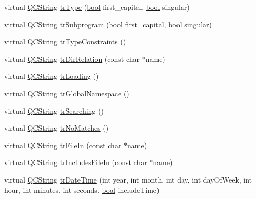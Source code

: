 \begin{DoxyCompactItemize}
\item 
virtual \hyperlink{class_q_c_string}{Q\+C\+String} \hyperlink{class_translator_italian_ab1598d928fcf4981cf664b9b13c5b1dd}{tr\+Type} (\hyperlink{qglobal_8h_a1062901a7428fdd9c7f180f5e01ea056}{bool} first\+\_\+capital, \hyperlink{qglobal_8h_a1062901a7428fdd9c7f180f5e01ea056}{bool} singular)
\item 
virtual \hyperlink{class_q_c_string}{Q\+C\+String} \hyperlink{class_translator_italian_ad964d826780fc1c39d0235a96b1a8544}{tr\+Subprogram} (\hyperlink{qglobal_8h_a1062901a7428fdd9c7f180f5e01ea056}{bool} first\+\_\+capital, \hyperlink{qglobal_8h_a1062901a7428fdd9c7f180f5e01ea056}{bool} singular)
\item 
virtual \hyperlink{class_q_c_string}{Q\+C\+String} \hyperlink{class_translator_italian_a60c14a7c39acb5257895aa373d62b357}{tr\+Type\+Constraints} ()
\item 
virtual \hyperlink{class_q_c_string}{Q\+C\+String} \hyperlink{class_translator_italian_a9a38c71fc11707e3095cf33089637526}{tr\+Dir\+Relation} (const char $\ast$name)
\item 
virtual \hyperlink{class_q_c_string}{Q\+C\+String} \hyperlink{class_translator_italian_a069fabe48f5ed739388c56794d1fcfda}{tr\+Loading} ()
\item 
virtual \hyperlink{class_q_c_string}{Q\+C\+String} \hyperlink{class_translator_italian_a71627a12293fe9dea4888f56060b9e4b}{tr\+Global\+Namespace} ()
\item 
virtual \hyperlink{class_q_c_string}{Q\+C\+String} \hyperlink{class_translator_italian_aa277a137695fe86514bea76d89476e25}{tr\+Searching} ()
\item 
virtual \hyperlink{class_q_c_string}{Q\+C\+String} \hyperlink{class_translator_italian_aeb4fccbcab8c8472bc6436141399e2c7}{tr\+No\+Matches} ()
\item 
virtual \hyperlink{class_q_c_string}{Q\+C\+String} \hyperlink{class_translator_italian_abf9ddba80a74df4604cd2e533fa4386c}{tr\+File\+In} (const char $\ast$name)
\item 
virtual \hyperlink{class_q_c_string}{Q\+C\+String} \hyperlink{class_translator_italian_ab672d5c6610c57b8abcedfc8bea00b10}{tr\+Includes\+File\+In} (const char $\ast$name)
\item 
virtual \hyperlink{class_q_c_string}{Q\+C\+String} \hyperlink{class_translator_italian_ac09695d9dcfda40eadace52441635d10}{tr\+Date\+Time} (int year, int month, int day, int day\+Of\+Week, int hour, int minutes, int seconds, \hyperlink{qglobal_8h_a1062901a7428fdd9c7f180f5e01ea056}{bool} include\+Time)

\end{DoxyCompactItemize}
